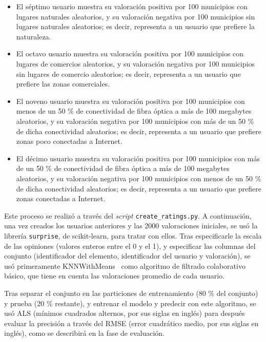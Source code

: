 \begin{itemize}
    \item El séptimo usuario muestra su valoración positiva por 100 municipios con lugares naturales aleatorios, y su valoración negativa por 100 municipios sin lugares naturales aleatorios; es decir, representa a un usuario que prefiere la naturaleza.

    \item El octavo usuario muestra su valoración positiva por 100 municipios con lugares de comercios aleatorios, y su valoración negativa por 100 municipios sin lugares de comercio aleatorios; es decir, representa a un usuario que prefiere las zonas comerciales.

    \item El noveno usuario muestra su valoración positiva por 100 municipios con menos de un 50 \% de conectividad de fibra óptica a más de 100 megabytes aleatorios, y su valoración negativa por 100 municipios con más de un 50 \% de dicha conectividad aleatorios; es decir, representa a un usuario que prefiere zonas poco conectadas a Internet.

    \item El décimo usuario muestra su valoración positiva por 100 municipios con más de un 50 \% de conectividad de fibra óptica a más de 100 megabytes aleatorios, y su valoración negativa por 100 municipios con menos de un 50 \% de dicha conectividad aleatorios; es decir, representa a un usuario que prefiere zonas conectadas a Internet.

\end{itemize}

Este proceso se realizó a través del \textit{script} \texttt{create\_ratings.py}. A continuación, una vez creados los usuarios anteriores y las 2000 valoraciones iniciales, se usó la librería \texttt{surprise}, de scikit-learn, para tratar con ellos. Tras especificarle la escala de las opiniones (valores enteros entre el 0 y el 1), y especificar las columnas del conjunto (identificador del elemento, identificador del usuario y valoración), se usó primeramente KNNWithMeans~\cite{scikit_surprise} como algoritmo de filtrado colaborativo básico, que tiene en cuenta las valoraciones promedio de cada usuario.

Tras separar el conjunto en las particiones de entrenamiento (80 \% del conjunto) y prueba (20 \% restante), y entrenar el modelo y predecir con este algoritmo, se usó ALS (mínimos cuadrados alternos, por sus siglas en inglés) para después evaluar la precisión a través del RMSE (error cuadrático medio, por sus siglas en inglés), como se describirá en la fase de evaluación.

